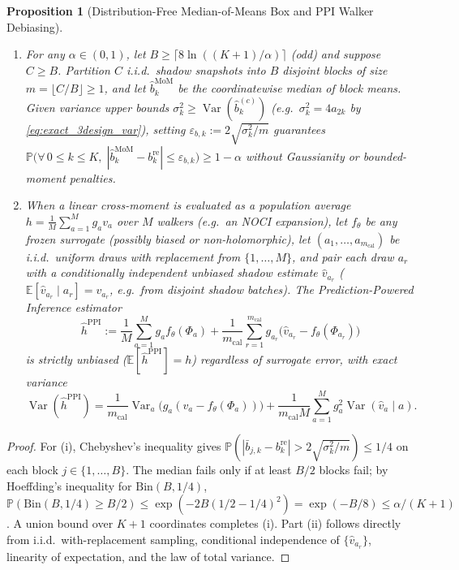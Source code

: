 \documentclass[11pt,a4paper]{article}
\newtheorem{proposition}[theorem]{Proposition}
\theoremstyle{definition}
\DeclareMathOperator{\Var}{Var}
\begin{document}
\begin{proposition}[Distribution-Free Median-of-Means Box and PPI Walker Debiasing]\label{prop:ppi}
\begin{enumerate}[label=(\roman*),leftmargin=1.8em]
  \item For any $\alpha \in (0, 1)$, let $B \ge \lceil 8 \ln((K+1)/\alpha)\rceil$ (odd) and suppose $C \ge B$. Partition $C$ i.i.d.\ shadow snapshots into $B$ disjoint blocks of size $m = \lfloor C/B \rfloor \ge 1$, and let $\hat{b}_k^{\mathrm{MoM}}$ be the coordinatewise median of block means. Given variance upper bounds $\sigma_k^2 \ge \Var(\hat{b}_k^{(c)})$ (e.g.\ $\sigma_k^2 = 4 a_{2k}$ by \eqref{eq:exact_3design_var}), setting $\varepsilon_{b,k} := 2\sqrt{\sigma_k^2 / m}$ guarantees $\mathbb{P}\big(\forall\, 0 \le k \le K,\; |\hat{b}_k^{\mathrm{MoM}} - b_k^{\mathrm{re}}| \le \varepsilon_{b,k}\big) \ge 1 - \alpha$ without Gaussianity or bounded-moment penalties.
  \item When a linear cross-moment is evaluated as a population average $h = \frac{1}{M}\sum_{a=1}^M g_a v_a$ over $M$ walkers (e.g.\ an NOCI expansion), let $f_\theta$ be \emph{any} frozen surrogate (possibly biased or non-holomorphic), let $(a_1,\dots,a_{m_{\mathrm{cal}}})$ be i.i.d.\ uniform draws \emph{with replacement} from $\{1,\dots,M\}$, and pair each draw $a_r$ with a conditionally independent unbiased shadow estimate $\hat{v}_{a_r}$ ($\mathbb{E}[\hat{v}_{a_r} \mid a_r] = v_{a_r}$, e.g.\ from disjoint shadow batches). The Prediction-Powered Inference estimator \cite{angelopoulos2023prediction}
  \[
    \widehat{h}^{\mathrm{PPI}} := \frac{1}{M}\sum_{a=1}^M g_a f_\theta(\Phi_a) + \frac{1}{m_{\mathrm{cal}}} \sum_{r=1}^{m_{\mathrm{cal}}} g_{a_r}\big(\hat{v}_{a_r} - f_\theta(\Phi_{a_r})\big)
  \]
  is strictly unbiased ($\mathbb{E}[\widehat{h}^{\mathrm{PPI}}] = h$) regardless of surrogate error, with exact variance
  \[
    \Var(\widehat{h}^{\mathrm{PPI}}) = \frac{1}{m_{\mathrm{cal}}}\Var_{a}\big(g_a(v_a - f_\theta(\Phi_a))\big) + \frac{1}{m_{\mathrm{cal}} M}\sum_{a=1}^M g_a^2 \Var(\hat{v}_a \mid a).
  \]
\end{enumerate}
\end{proposition}

\begin{proof}
For (i), Chebyshev's inequality gives $\mathbb{P}(|\bar{b}_{j,k} - b_k^{\mathrm{re}}| > 2\sqrt{\sigma_k^2/m}) \le 1/4$ on each block $j \in \{1,\dots,B\}$. The median fails only if at least $B/2$ blocks fail; by Hoeffding's inequality for $\mathrm{Bin}(B, 1/4)$, $\mathbb{P}(\mathrm{Bin}(B, 1/4) \ge B/2) \le \exp(-2 B (1/2 - 1/4)^2) = \exp(-B/8) \le \alpha/(K+1)$ \cite{lugosi2019mean}. A union bound over $K+1$ coordinates completes (i). Part (ii) follows directly from i.i.d.\ with-replacement sampling, conditional independence of $\{\hat{v}_{a_r}\}$, linearity of expectation, and the law of total variance.
\end{proof}
\end{document}
